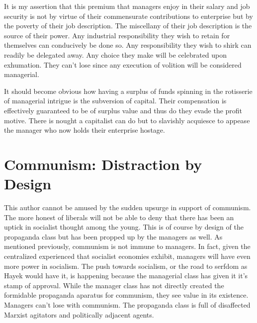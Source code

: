 \documentclass[12pt]{article}
\begin{document}
It is my assertion that this premium that managers enjoy in their salary and job security is not by virtue of their commensurate contributions to enterprise but by the poverty of their job description.
The miscellany of their job description is the source of their power.
Any industrial responsibility they wish to retain for themselves can conducively be done so.
Any responsibility they wish to shirk can readily be delegated away.
Any choice they make will be celebrated upon exhumation.
They can't lose since any execution of volition will be considered managerial.

It should become obvious how having a surplus of funds spinning in the rotisserie of managerial intrigue is the subversion of capital.
Their compensation is effectively guaranteed to be of surplus value and thus do they evade the profit motive.
There is nought a capitalist can do but to slavishly acquiesce to appease the manager who now holds their enterprise hostage.

\section{Communism: Distraction by Design}
This author cannot be amused by the sudden upsurge in support of communism.
The more honest of liberals will not be able to deny that there has been an uptick in socialist thought among the young.
This is of course by design of the propaganda class but has been propped up by the managers as well.
As mentioned previously, communism is not immune to managers.
In fact, given the centralized experienced that socialist economies exhibit, managers will have even more power in socialism.
The push towards socialism, or the road to serfdom as Hayek would have it, is happening because the managerial class has given it it's stamp of approval.
While the manager class has not directly created the formidable propaganda aparatus for communism, they see value in its existence.
Managers can't lose with communism.
The propaganda class is full of disaffected Marxist agitators and politically adjacent agents.
\end{document}
